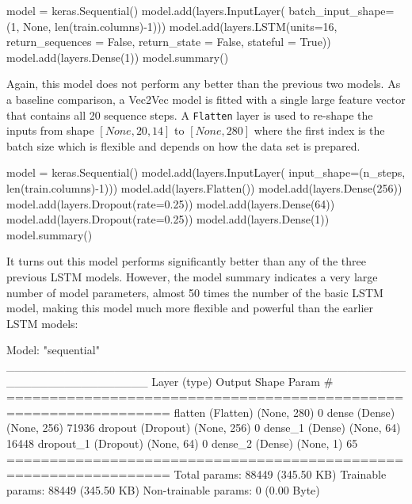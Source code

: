 \begin{withcode}
\begin{pythoncode}
model = keras.Sequential()
model.add(layers.InputLayer(
    batch_input_shape=(1, None, len(train.columns)-1)))
model.add(layers.LSTM(units=16,
    return_sequences = False, 
    return_state = False, 
    stateful = True))
model.add(layers.Dense(1))
model.summary()
\end{pythoncode}

Again, this model does not perform any better than the previous two models. As a baseline comparison, a Vec2Vec model is fitted with a single large feature vector that contains all 20 sequence steps. A \texttt{Flatten} layer is used to re-shape the inputs from shape $[None, 20, 14]$ to $[None, 280]$ where the first index is the batch size which is flexible and depends on how the data set is prepared.

\begin{pythoncode}
model = keras.Sequential()
model.add(layers.InputLayer(
    input_shape=(n_steps, len(train.columns)-1)))
model.add(layers.Flatten())
model.add(layers.Dense(256))
model.add(layers.Dropout(rate=0.25))
model.add(layers.Dense(64))
model.add(layers.Dropout(rate=0.25))
model.add(layers.Dense(1))
model.summary()
\end{pythoncode}

It turns out this model performs significantly better than any of the three previous LSTM models. However, the model summary indicates a very large number of model parameters, almost 50 times the number of the basic LSTM model, making this model much more flexible and powerful than the earlier LSTM models:

\begin{textcode}
Model: "sequential"
_________________________________________________________________
 Layer (type)                Output Shape              Param #   
=================================================================
 flatten (Flatten)           (None, 280)               0         
 dense (Dense)               (None, 256)               71936     
 dropout (Dropout)           (None, 256)               0         
 dense_1 (Dense)             (None, 64)                16448     
 dropout_1 (Dropout)         (None, 64)                0         
 dense_2 (Dense)             (None, 1)                 65        
=================================================================
Total params: 88449 (345.50 KB)
Trainable params: 88449 (345.50 KB)
Non-trainable params: 0 (0.00 Byte)
\end{textcode}
\end{withcode}

